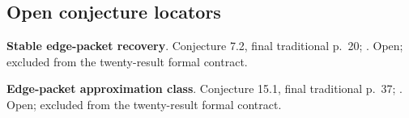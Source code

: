 \subsection{Open conjecture locators}
\textbf{Stable edge-packet recovery}. Conjecture 7.2, final traditional p.~20; . Open; excluded from the twenty-result formal contract.\par
\textbf{Edge-packet approximation class}. Conjecture 15.1, final traditional p.~37; . Open; excluded from the twenty-result formal contract.\par

